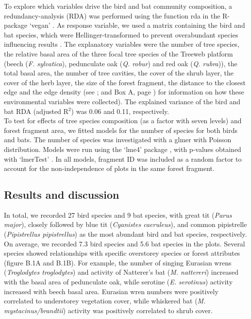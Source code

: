 \documentclass[10pt, twoside]{book} %
\begin{document}
To explore which variables drive the bird and bat community composition, a redundancy-analysis (RDA) was performed using the function rda in the R-package `vegan' \citep{Oksanen2018}. As response variable, we used a matrix containing the bird and bat species, which were Hellinger-transformed to prevent overabundant species influencing results \citep{Legendre2001}. The explanatory variables were the number of tree species, the relative basal area of the three focal tree species of the Treeweb platform (beech (\textit{F. sylvatica}), pedunculate oak (\textit{Q. robur}) and red oak (\textit{Q. rubra})), the total basal area, the number of tree cavities, the cover of the shrub layer, the cover of the herb layer, the size of the forest fragment, the distance to the closest edge and the edge density (see \citealt{DeGroote2017}; and Box A, page \pageref{boxa}) for information on how these environmental variables were collected). The explained variance of the bird and bat RDA (adjusted R$^2$) was 0.06 and 0.11, respectively.\\

To test for effects of tree species composition (as a factor with seven levels) and forest fragment area, we fitted models for the number of species for both birds and bats. The number of species was investigated with a glmer with Poisson distribution. Models were run using the `lme4' package \citep{Bates2015}, with p-values obtained with `lmerTest' \citep{Kuznetsova2017}. In all models, fragment ID was included as a random factor to account for the non-independence of plots in the same forest fragment.\\

\subsection*{Results and discussion}
In total, we recorded 27 bird species and 9 bat species, with great tit (\textit{Parus major}), closely followed by blue tit (\textit{Cyanistes caeruleus}), and common pipistrelle (\textit{Pipistrellus pipistrellus}) as the most abundant bird and bat species, respectively. On average, we recorded 7.3 bird species and 5.6 bat species in the plots. Several species showed relationships with specific overstorey species or forest attributes (figure B.1A and B.1B). For example, the number of singing Eurasian wrens (\textit{Troglodytes troglodytes}) and activity of Natterer's bat (\textit{M. nattereri}) increased with the basal area of pedunculate oak, while serotine (\textit{E. serotinus}) activity increased with beech basal area. Eurasian wren numbers were positively correlated to understorey vegetation cover, while whiskered bat (\textit{M. mystacinus/brandtii}) activity was positively correlated to shrub cover.\\
\end{document}
